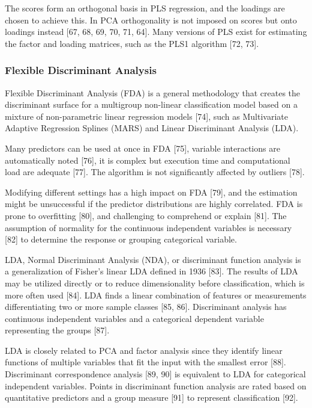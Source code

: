 \documentclass[sn-mathphys-num]{sn-jnl}%
\begin{document}
The scores form an orthogonal basis in PLS regression, and the loadings are chosen to achieve this. In PCA orthogonality is not imposed on scores but onto loadings instead [67, 68, 69, 70, 71, 64]. Many versions of PLS exist for estimating the factor and loading matrices, such as the PLS1 algorithm [72, 73]. 

\subsubsection{Flexible Discriminant Analysis}

Flexible Discriminant Analysis (FDA) is a general methodology that creates the discriminant surface for a multigroup non-linear classification model based on a mixture of non-parametric linear regression models [74], such as Multivariate Adaptive Regression Splines (MARS) and Linear Discriminant Analysis (LDA).

Many predictors can be used at once in FDA [75], variable interactions are automatically noted [76], it is complex but execution time and computational load are adequate [77]. The algorithm is not significantly affected by outliers [78].

Modifying different settings has a high impact on FDA [79], and the estimation might be unsuccessful if the predictor distributions are highly correlated. FDA is prone to overfitting [80], and challenging to comprehend or explain [81]. The assumption of normality for the continuous independent variables is necessary [82] to determine the response or grouping categorical variable. 

LDA, Normal Discriminant Analysis (NDA), or discriminant function analysis is a generalization of Fisher's linear LDA defined in 1936 [83]. The results of LDA may be utilized directly or to reduce dimensionality before classification, which is more often used [84]. LDA finds a linear combination of features or measurements differentiating two or more sample classes [85, 86]. Discriminant analysis has continuous independent variables and a categorical dependent variable representing the groups [87].

LDA is closely related to PCA and factor analysis since they identify linear functions of multiple variables that fit the input with the smallest error [88]. Discriminant correspondence analysis [89, 90] is equivalent to LDA for categorical independent variables. Points in discriminant function analysis are rated based on quantitative predictors and a group measure [91] to represent classification [92].
\end{document}
